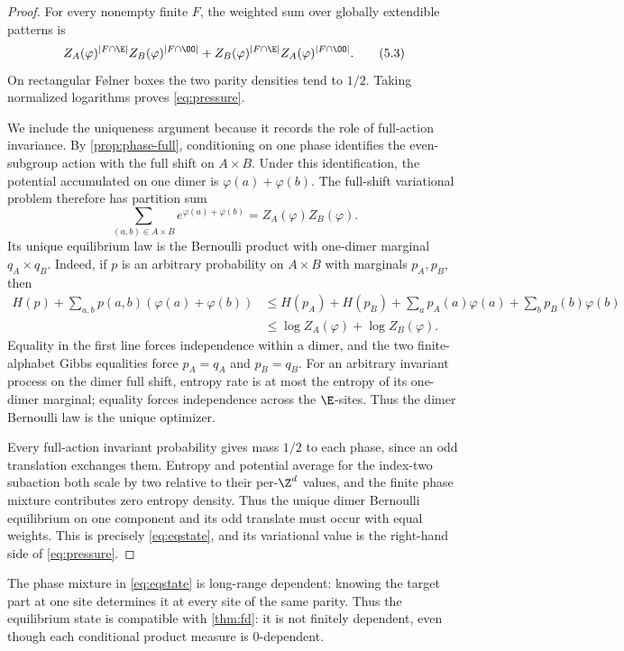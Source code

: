 \begin{proof}
For every nonempty finite $F$, the weighted sum over globally extendible
patterns is
\[
 Z_A(\varphi)^{|F\cap\E|}Z_B(\varphi)^{|F\cap\OO|}
 +Z_B(\varphi)^{|F\cap\E|}Z_A(\varphi)^{|F\cap\OO|}.
 \tag{5.3}\label{eq:weighted-count}
\]
On rectangular Følner boxes the two parity densities tend to $1/2$.
Taking normalized logarithms proves \eqref{eq:pressure}.

We include the uniqueness argument because it records the role of full-action
invariance.  By \cref{prop:phase-full}, conditioning on one phase identifies
the even-subgroup action with the full shift on $A\times B$.  Under this
identification, the potential accumulated on one dimer is
$\varphi(a)+\varphi(b)$.  The full-shift variational problem therefore has
partition sum
\[
 \sum_{(a,b)\in A\times B}e^{\varphi(a)+\varphi(b)}
 =Z_A(\varphi)Z_B(\varphi).
\]
Its unique equilibrium law is the Bernoulli product with one-dimer marginal
$q_A\times q_B$.  Indeed, if $p$ is an arbitrary probability on $A\times B$
with marginals $p_A,p_B$, then
\begin{align*}
 H(p)+\sum_{a,b}p(a,b)(\varphi(a)+\varphi(b))
 &\leq H(p_A)+H(p_B)
   +\sum_a p_A(a)\varphi(a)+\sum_b p_B(b)\varphi(b)\\
 &\leq \log Z_A(\varphi)+\log Z_B(\varphi).
\end{align*}
Equality in the first line forces independence within a dimer, and the two
finite-alphabet Gibbs equalities force $p_A=q_A$ and $p_B=q_B$.  For an
arbitrary invariant process on the dimer full shift, entropy rate is at most
the entropy of its one-dimer marginal; equality forces independence across
the $\E$-sites.  Thus the dimer Bernoulli law is the unique optimizer.

Every full-action invariant probability gives mass $1/2$ to each phase,
since an odd translation exchanges them.  Entropy and potential average for
the index-two subaction both scale by two relative to their per-$\Z^d$
values, and the finite phase mixture contributes zero entropy density.  Thus
the unique dimer
Bernoulli equilibrium on one component and its odd translate must occur with
equal weights.  This is precisely \eqref{eq:eqstate}, and its variational
value is the right-hand side of \eqref{eq:pressure}.
\end{proof}

The phase mixture in \eqref{eq:eqstate} is long-range dependent: knowing the
target part at one site determines it at every site of the same parity.  Thus
the equilibrium state is compatible with \cref{thm:fd}: it is not finitely
dependent, even though each conditional product measure is $0$-dependent.
